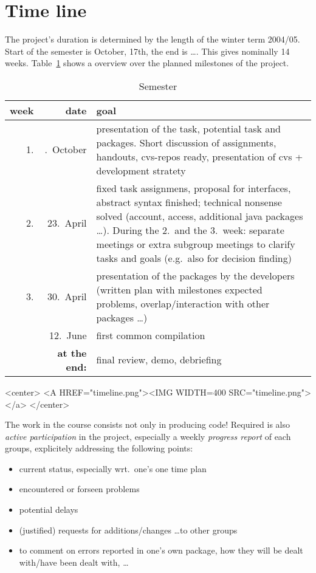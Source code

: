 
\section*{Time line}
\label{sec:timeline}



The project's duration is determined by the length of the winter term 2004/05.
Start of the semester is October, 17th, the end is \ldots. This gives
nominally 14 weeks.  Table~\ref{tab:semester} shows a overview over the
planned milestones of the project.

\begin{table}[htbp]
  \begin{center}
    \begin{tabular}{rrp{9cm}}
      week & date & goal
      \\\hline
      1. & .\ October  &  presentation of the task, potential task and
      packages. Short 
      discussion of assignments, handouts, cvs-repos ready, presentation
      of cvs + development stratety
      \\
      2. & 23.\ April  &  fixed task assignmens, proposal for interfaces,
      abstract syntax finished; technical  nonsense solved (account,
      access, additional java packages \ldots).
      During the 2.\ and the 3.\ week: separate meetings or extra subgroup
      meetings to clarify tasks and goals (e.g.\ also for decision finding)
      \\
      3. & 30.\ April & 
      presentation of the packages by the developers (written plan with
      milestones expected problems, overlap/interaction with other packages
      \ldots)
      \\
      & 12.\ June &
      first common compilation
      \\
       & \textbf{at the end:} & final review, demo, debriefing
    \end{tabular}
    \caption{Semester}
    \label{tab:semester}
  \end{center}
\end{table}


\begin{rawhtml}
  <center>
  <A HREF="timeline.png"><IMG  WIDTH=400 SRC="timeline.png"> </a>
  </center>
\end{rawhtml}



The work in the course consists not only in producing code!  Required is
also \emph{active participation} in the project, especially a weekly
\emph{progress report} of each groups, explicitely addressing the following
points:
\begin{itemize}
\item current status, especially wrt.\ one's one time plan
\item encountered or forseen problems
\item potential delays
\item (justified) requests for additions/changes \ldots to other groups
\item to comment on errors reported in one's own package, how they will be
  dealt with/have been dealt with, \ldots
\end{itemize}



